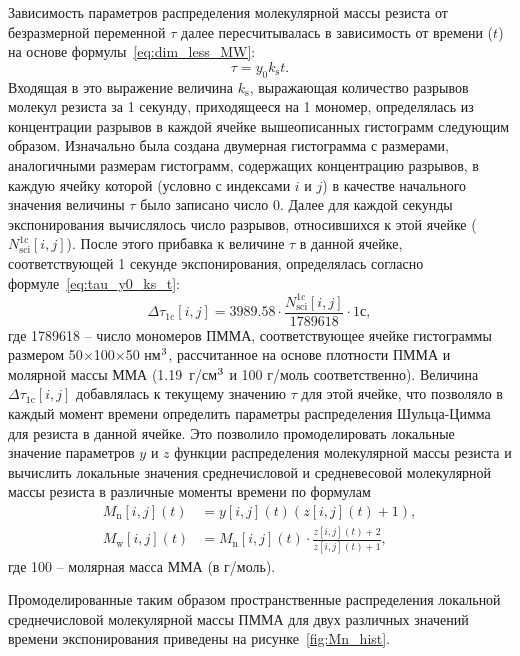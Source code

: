 Зависимость параметров распределения молекулярной массы резиста от безразмерной переменной $\tau$ далее пересчитывалась в зависимость от времени ($t$) на основе формулы~\ref{eq:dim_less_MW}:
\begin{equation} \label{eq:tau_y0_ks_t}
	\tau = y_0 k_\mathrm{s} t.
\end{equation}
Входящая в это выражение величина $k_\mathrm{s}$, выражающая количество разрывов молекул резиста за 1 секунду, приходящееся на 1 мономер, определялась из концентрации разрывов в каждой ячейке вышеописанных гистограмм следующим образом. Изначально была создана двумерная гистограмма с размерами, аналогичными размерам гистограмм, содержащих концентрацию разрывов, в каждую ячейку которой (условно с индексами $i$ и $j$) в качестве начального значения величины $\tau$ было записано число 0. Далее для каждой секунды экспонирования вычислялось число разрывов, относившихся к этой ячейке ($N_\mathrm{sci}^\mathrm{1c}[i,j]$). После этого прибавка к величине $\tau$ в данной ячейке, соответствующей 1 секунде экспонирования, определялась согласно формуле~\ref{eq:tau_y0_ks_t}:
\begin{equation}
	\Delta \tau_\mathrm{1c} [i,j] = 3989.58 \cdot \frac{N_\mathrm{sci}^\mathrm{1c}[i,j]}{1789618} \cdot 1с,
\end{equation}
где 1789618 -- число мономеров ПММА, соответствующее ячейке гистограммы размером 50$\times$100$\times$50 нм$^\text{3}$, рассчитанное на основе плотности ПММА и молярной массы ММА (1.19~г/см$^\text{3}$ и 100 г/моль соответственно). Величина $\Delta \tau_\mathrm{1c} [i,j]$ добавлялась к текущему значению $\tau$ для этой ячейке, что позволяло в каждый момент времени определить параметры распределения Шульца-Цимма для резиста в данной ячейке. Это позволило промоделировать локальные значение параметров $y$ и $z$ функции распределения молекулярной массы резиста и вычислить локальные значения среднечисловой и средневесовой молекулярной массы резиста в различные моменты времени по формулам
\begin{equation}
	\begin{aligned}
	M_\mathrm{n} [i,j] (t) & = y[i,j] (t) (z [i,j] (t) + 1), \\
	M_\mathrm{w} [i,j] (t) & = M_\mathrm{n} [i,j] (t) \cdot \frac{z[i,j] (t) + 2}{z[i,j] (t) + 1},
	\end{aligned}
\end{equation}
где 100 -- молярная масса ММА (в г/моль).

Промоделированные таким образом пространственные распределения локальной среднечисловой молекулярной массы ПММА для двух различных значений времени экспонирования приведены на рисунке~\ref{fig:Mn_hist}.


